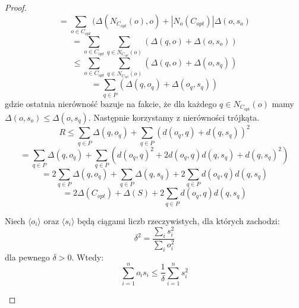 \begin{proof}
\begin{equation}
    \end{equation}
    \begin{equation}
        = \sum_{o \in C_{opt}} (\Delta(N_{C_{opt}}(o), o) + |N_{o}(C_{opt})| \Delta(o, s_{o})
    \end{equation}
    \begin{equation}
        = \sum_{o \in C_{opt}} \sum_{q \in N_{C_{opt}}(o)} (\Delta(q, o) + \Delta(o, s_{o}))
    \end{equation}
    \begin{equation}
        \leq \sum_{o \in C_{opt}} \sum_{q \in N_{C_{opt}}(o)} (\Delta(q, o) + \Delta(o, s_{q}))
    \end{equation}
    \begin{equation}
        = \sum_{q \in P} (\Delta(q, o_{q}) + \Delta(o_{q}, s_{q}))
    \end{equation}
    gdzie ostatnia nierówność bazuje na fakcie, że dla każdego $q \in N_{C_{opt}}(o)$ mamy $\Delta(o, s_{o}) \leq \Delta(o, s_{q})$.
    Następnie korzystamy z nierówności trójkąta.
    \begin{equation}
        R \leq  \sum_{q \in P} \Delta(q, o_{q}) + \sum_{q \in P} ( d(o_{q}, q) + d(q, s_{q}))^{2}
    \end{equation}
    \begin{equation}
        = \sum_{q \in P} \Delta(q, o_{q}) + \sum_{q \in P} ( d(o_{q}, q)^{2} + 2d(o_{q}, q)d(q, s_{q}) + d(q, s_{q})^{2})
    \end{equation}
    \begin{equation}
        = 2\sum_{q \in P} \Delta(q, o_{q}) + \sum_{q \in P} \Delta(q, s_{q}) + 2\sum_{q \in P} d(o_{q}, q)d(q, s_{q})
    \end{equation}
    \begin{equation}
        = 2\Delta(C_{opt}) + \Delta(S) + 2\sum_{q \in P} d(o_{q}, q)d(q, s_{q})
    \end{equation}
    \begin{lemma}{\cite{10.1145/1007352.1007400}}
        Niech $\langle o_{i} \rangle$ oraz $\langle s_{i} \rangle$ będą ciągami liczb rzeczywistych, dla których zachodzi:
        \begin{equation}
            \delta^2 = \frac{\sum_{i} s_{i}^{2}}{\sum_{i} o_{i}^{2}}
        \end{equation}
        dla pewnego $\delta > 0$.
        Wtedy:
        \begin{equation}
            \sum_{i=1}^{n} o_{i} s_{i} \leq \frac{1}{\delta} \sum_{i=1}^{n} s_{i}^{2}
        \end{equation}

\end{lemma}
\end{proof}
